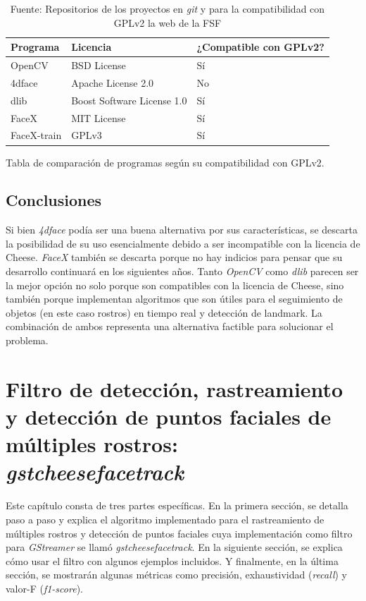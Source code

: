\documentclass[a4paper,openright,12pt]{report}
\begin{document}
\begin{center}
	\begin{table}[h]
      \begin{tabular}{| l | l | l |}
      \hline
      Programa & Licencia & ¿Compatible con GPLv2? \\ \hline
      OpenCV & BSD License & Sí \\ \hline
      4dface & Apache License 2.0 & No \\ \hline
      dlib & Boost Software License 1.0 & Sí \\ \hline
      FaceX & MIT License & Sí \\ \hline
      FaceX-train & GPLv3 & Sí \\ \hline
      \end{tabular}
      \caption{Tabla de comparación de programas según su compatibilidad con GPLv2.}
      \caption*{Fuente: Repositorios de los proyectos en \textit{git}
                \cite{openCVLicense}\cite{dlibLicense2}\cite{faceXLicense}
                \cite{4dfaceLicense} y para la compatibilidad con GPLv2 la web de
                la FSF \cite{GPLv2Compatibility}}
	\end{table}
\end{center}


\section{Conclusiones}
Si bien \textit{4dface} podía ser una buena alternativa por sus características,
se descarta la posibilidad de su uso esencialmente debido a ser incompatible
con la licencia de Cheese. \textit{FaceX} también se descarta porque no hay
indicios para pensar que su desarrollo continuará en los siguientes años. Tanto
\textit{OpenCV} como \textit{dlib} parecen ser la mejor opción no solo porque
son compatibles con la licencia de Cheese, sino también porque implementan
algoritmos que son útiles para el seguimiento de objetos (en este caso rostros)
en tiempo real y detección de landmark. La combinación de ambos representa una
alternativa factible para solucionar el problema.

\chapter{Filtro de detección, rastreamiento y detección de puntos faciales de
múltiples rostros: \textit{gstcheesefacetrack}}
Este capítulo consta de tres partes específicas. En la primera sección, se
detalla paso a paso y explica el algoritmo implementado para el rastreamiento de
múltiples rostros y detección de puntos faciales cuya implementación como filtro
para \textit{GStreamer} se llamó \textit{gstcheesefacetrack}. En la siguiente
sección, se explica cómo usar el filtro con algunos ejemplos incluidos. Y
finalmente, en la última sección, se mostrarán algunas métricas como
precisión, exhaustividad (\textit{recall}) y valor-F (\textit{f1-score}).
\end{document}
